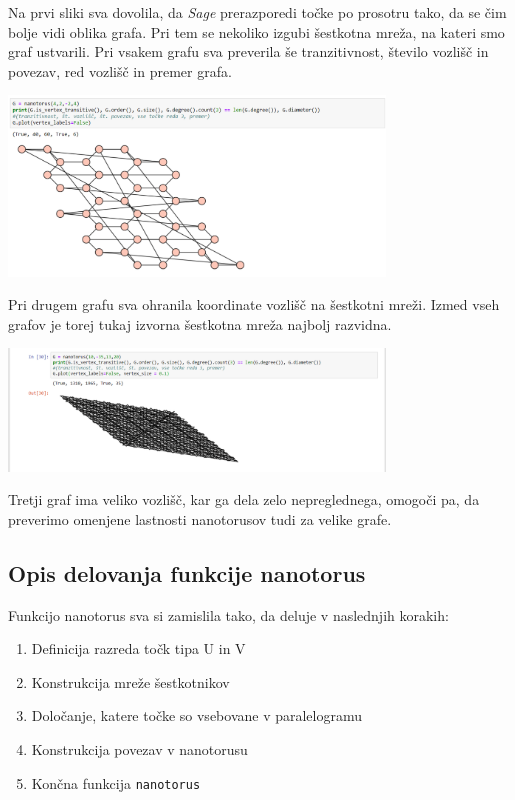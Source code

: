 \documentclass[a4paper, 10 pt, titlepage]{article}
\begin{document}
Na prvi sliki sva dovolila, da \textit{Sage} prerazporedi točke po prosotru tako, da se čim bolje vidi oblika grafa. Pri tem se nekoliko izgubi šestkotna mreža, na kateri smo graf ustvarili. Pri vsakem grafu sva preverila še tranzitivnost, število vozlišč in povezav, red vozlišč in premer grafa.
\vspace{1cm}

\begin{center}
\includegraphics[width=10cm]{nano1}
\end{center}
\vspace{1cm}

Pri drugem grafu sva ohranila koordinate vozlišč na šestkotni mreži. Izmed vseh grafov je torej tukaj izvorna šestkotna mreža najbolj razvidna.
\vspace{1cm}

\begin{center}
\includegraphics[width=10cm]{nano3}
\end{center}
\vspace{1cm}

Tretji graf ima veliko vozlišč, kar ga dela zelo nepreglednega, omogoči pa, da preverimo omenjene lastnosti nanotorusov tudi za velike grafe.

\subsection{Opis delovanja funkcije nanotorus}

Funkcijo nanotorus sva si zamislila tako, da deluje v naslednjih korakih:

\begin{enumerate}
\item Definicija razreda točk tipa U in V
\item Konstrukcija mreže šestkotnikov
\item Določanje, katere točke so vsebovane v paralelogramu
\item Konstrukcija povezav v nanotorusu
\item Končna funkcija \texttt{nanotorus}
\end{enumerate}
\end{document}

